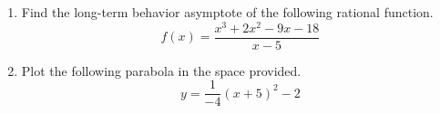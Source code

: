 \documentclass{article}
\begin{document}
\begin{enumerate}
\begin{center}
\CartesianPlane[axes=yes,h=10,w=10]
\end{center} \vspace{1cm}

\newpage

\item Find the long-term behavior asymptote of the following rational function. \[ f(x) = \frac{x^3 + 2x^2 - 9x - 18}{x - 5} \] \vspace{6cm}

\item Plot the following parabola in the space provided. \[ y = \frac{1}{-4} \left(x + 5\right)^2 -2 \]

\begin{center}
\CartesianPlane[axes=yes,h=10,w=10]
\end{center} \vspace{1cm}
\end{enumerate}
\end{document}
